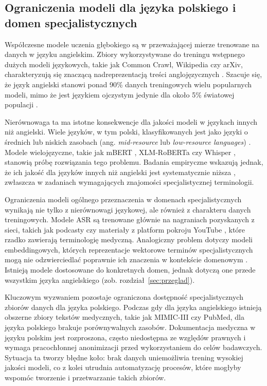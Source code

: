 \subsection{Ograniczenia modeli dla języka polskiego i domen specjalistycznych}
\label{sec:motywacja}

Współczesne modele uczenia głębokiego są w przeważającej mierze trenowane na danych w języku angielskim. Zbiory wykorzystywane do treningu wstępnego dużych modeli językowych, takie jak Common Crawl, Wikipedia czy arXiv, charakteryzują się znaczącą nadreprezentacją treści anglojęzycznych \cite{joshi2020state}. Szacuje się, że język angielski stanowi ponad 90\% danych treningowych wielu popularnych modeli, mimo że jest językiem ojczystym jedynie dla około 5\% światowej populacji \cite{bender2021dangers}.

Nierównowaga ta ma istotne konsekwencje dla jakości modeli w językach innych niż angielski. Wiele języków, w tym polski, klasyfikowanych jest jako języki o średnich lub niskich zasobach (ang. \textit{mid-resource} lub \textit{low-resource languages}) \cite{joshi2020state}. Modele wielojęzyczne, takie jak mBERT \cite{devlin2019bert}, XLM-RoBERTa \cite{conneau2020unsupervised} czy Whisper \cite{whisper}, stanowią próbę rozwiązania tego problemu. Badania empiryczne wskazują jednak, że ich jakość dla języków innych niż angielski jest systematycznie niższa \cite{wu2020all}, zwłaszcza w zadaniach wymagających znajomości specjalistycznej terminologii.

Ograniczenia modeli ogólnego przeznaczenia w domenach specjalistycznych wynikają nie tylko z nierównowagi językowej, ale również z charakteru danych treningowych. Modele ASR są trenowane głównie na nagraniach pozyskanych z sieci, takich jak podcasty czy materiały z platform pokroju YouTube \cite{whisper}, które rzadko zawierają terminologię medyczną. Analogiczny problem dotyczy modeli embeddingowych, których reprezentacje wektorowe terminów specjalistycznych mogą nie odzwierciedlać poprawnie ich znaczenia w kontekście domenowym \cite{lee2020biobert}. Istnieją modele dostosowane do konkretnych domen, jednak dotyczą one przede wszystkim języka angielskiego (zob. rozdział~\ref{sec:przeglad}).

Kluczowym wyzwaniem pozostaje ograniczona dostępność specjalistycznych zbiorów danych dla języka polskiego. Podczas gdy dla języka angielskiego istnieją obszerne zbiory tekstów medycznych, takie jak MIMIC-III \cite{johnson2016mimic} czy PubMed, dla języka polskiego brakuje porównywalnych zasobów. Dokumentacja medyczna w języku polskim jest rozproszona, często niedostępna ze względów prawnych i wymaga pracochłonnej anonimizacji przed wykorzystaniem do celów badawczych. Sytuacja ta tworzy błędne koło: brak danych uniemożliwia trening wysokiej jakości modeli, co z kolei utrudnia automatyzację procesów, które mogłyby wspomóc tworzenie i przetwarzanie takich zbiorów.

